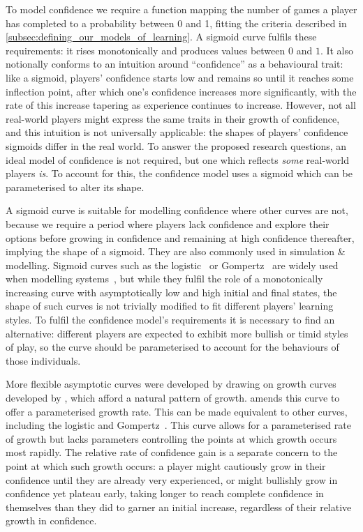 To model confidence we require a function mapping the number of games a player
has completed to a probability between 0 and 1, fitting the criteria described
in \cref{subsec:defining_our_models_of_learning}. A sigmoid curve fulfils these
requirements: it rises monotonically and produces values between $0$ and $1$. It
also notionally conforms to an intuition around ``confidence'' as a behavioural
trait: like a sigmoid, players' confidence starts low and remains so until it
reaches some inflection point, after which one's confidence increases more
significantly, with the rate of this increase tapering as experience continues to
increase. However, not all real-world players might express the same traits in
their growth of confidence, and this intuition is not universally applicable:
the shapes of players' confidence sigmoids differ in the real world. To answer
the proposed research questions, an ideal model of confidence is not required,
but one which reflects \emph{some} real-world players \emph{is}. To account
for this, the confidence model uses a sigmoid which can be parameterised to
alter its shape.

A sigmoid curve is suitable for modelling confidence where other curves are not,
because we require a period where players lack confidence and explore their
options before growing in confidence and remaining at high confidence
thereafter, implying the shape of a sigmoid. They are also commonly used in
simulation \& modelling. Sigmoid curves such as the
logistic~\cite{verhulst1845loi} or Gompertz~\cite{gompertz1815curve} are widely
used when modelling systems~\cite{werker1997modelling}, but while they fulfil
the role of a monotonically increasing curve with asymptotically low and high
initial and final states, the shape of such curves is not trivially modified to
fit different players' learning styles. To fulfil the confidence model's
requirements it is necessary to find an alternative: different players are
expected to exhibit more bullish or timid styles of play, so the curve should be
parameterised to account for the behaviours of those individuals.

More flexible asymptotic curves were developed by
\citet{richards1959flexiblegrowth}
drawing on growth curves developed by \citet{von1938quantitative}, which afford
a natural pattern of growth. \citeauthor{richards1959flexiblegrowth} amends this
curve to offer a parameterised growth rate. This can be made equivalent to other
curves, including the logistic and Gompertz~\cite{france1984mathematical}. This
curve allows for a parameterised rate of growth but lacks parameters controlling
the points at which growth occurs most rapidly. The relative rate of confidence
gain is a separate concern to the point at which such growth occurs: a player
might cautiously grow in their confidence until they are already very
experienced, or might bullishly grow in confidence yet plateau early, taking
longer to reach complete confidence in themselves than they did to garner an
initial increase, regardless of their relative growth in confidence.

